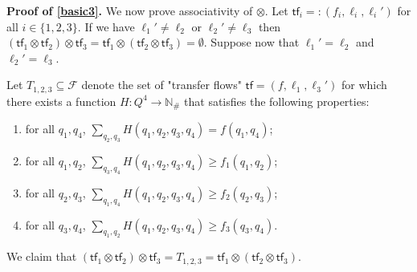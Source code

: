 \documentclass[10pt,a4paper]{article}
\let\mathbb\mathds
\renewcommand{\geq}{\geqslant}
\newcommand{\nats}{\mathbb{N}}
\newcommand{\set}[1]{\{#1\}}
\newcommand*{\states}{Q}
\newcommand*{\abuchistate}{\ell}
\newcommand*{\controlloc}{\abuchistate}
\newcommand*{\dummysymb}{\#}
\newcommand*{\natsanddummy}{\nats_{\dummysymb}}
\newcommand*{\transferflows}{\mathcal{F}}
\newcommand*{\atf}{\mathsf{tf}}
\newcommand*{\tftimes}{\otimes}
\begin{document}
\begin{appendixproof}
	\textbf{Proof of \ref{basic3}.}
	We now prove associativity of \(\tftimes\).
	Let \(\atf_i =: (f_i, \controlloc_i, \controlloc_i')\) for all \(i \in \set{1,2,3}\).
	If we have \(\controlloc_1' \ne \controlloc_2\) or \(\controlloc_2' \ne \controlloc_3\) then \((\atf_1 \tftimes \atf_2) \tftimes \atf_3 = \atf_1 \tftimes (\atf_2 \tftimes \atf_3) = \emptyset\).
	Suppose now that \(\controlloc_1' = \controlloc_2\) and \(\controlloc_2' = \controlloc_3\).

	Let \(T_{1,2,3}\subseteq \transferflows\) denote the set of "transfer flows" \(\atf = (f, \controlloc_1, \controlloc_3')\) for which there exists a function \(H : \states^4 \to \natsanddummy\) that satisfies the following properties:
	\begin{enumerate}[topsep=3pt]
		\item \label{associtivity-1} for all \(q_1, q_4\), \(\sum_{q_2,q_3}
		      H(q_1,q_2,q_3,q_4) = f(q_1,q_4)\); \item \label{associtivity-2} for all \(q_1,q_2\), \(\sum_{q_3,q_4} H(q_1,q_2,q_3,q_4) \geq f_1(q_1,q_2)\); \item \label{associtivity-3} for all \(q_2,q_3\), \(\sum_{q_1,q_4} H(q_1,q_2,q_3,q_4) \geq f_2(q_2,q_3)\); \item \label{associtivity-4} for all \(q_3,q_4\), \(\sum_{q_1,q_2} H(q_1,q_2,q_3,q_4) \geq f_3(q_3,q_4)\).
	\end{enumerate}
	We claim that \((\atf_1 \tftimes \atf_2) \tftimes \atf_3 = T_{1,2,3} = \atf_1 \tftimes (\atf_2 \tftimes \atf_3)\).


\end{appendixproof}
\end{document}
